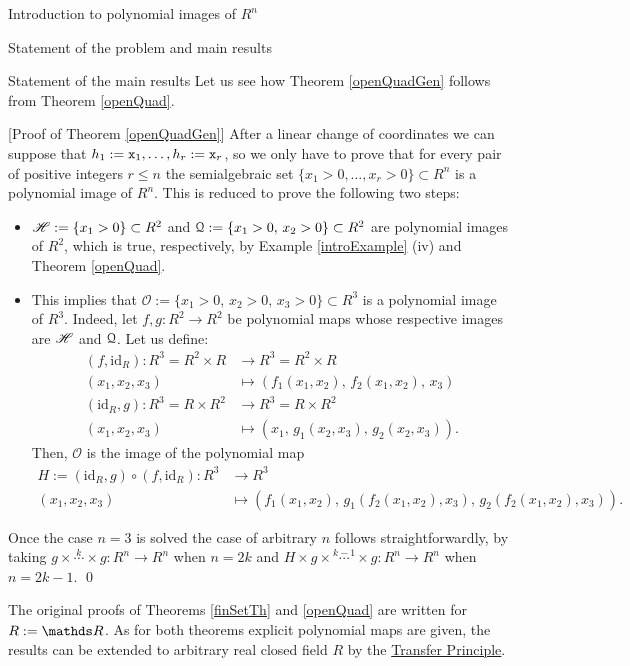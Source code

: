 \documentclass[11pt, a4paper, english, twoside, notitlepage, openright]{report}
\begin{document}
\begin{chapter}{Introduction to polynomial images of $R^n$}
\begin{section}{Statement of the problem and main results}
\begin{subsection}{Statement of the main results}
Let us see how Theorem \ref{openQuadGen} follows from Theorem \ref{openQuad}.
		
\vspace{1mm}		
		
[Proof of Theorem \ref{openQuadGen}] After a linear change of coordinates we can suppose that $h_1:={\tt x}_1,\dots,h_r:={\tt x}_r$, so we only have to prove that for every pair of positive integers $r\leq n$ the semialgebraic set $\{x_1>0,\dots,x_r>0\}\subset R^n$ is a polynomial image of $R^n$. This is reduced to prove the following two steps:
\begin{itemize}
\item $\mathscr{H}:=\{x_1>0\}\subset R^2$ and $\mathcal{Q}:=\{x_1>0,\,x_2>0\}\subset R^2$ are polynomial images of $R^2$, which is true, respectively, by Example \ref{introExample} (iv) and Theorem \ref{openQuad}.
\item This implies that $\mathscr{O}:=\{x_1>0,\, x_2>0,\, x_3>0\}\subset R^3$ is a polynomial image of $R^3$. Indeed, let $f,g:R^2 \rightarrow R^2$ be polynomial maps whose respective images are $\mathscr{H}$ and $\mathcal{Q}$. Let us define:
\begin{align*}
(f,\text{id}_R): R^3=R^2\times R&\longrightarrow R^3= R^2\times R\\
(x_1,x_2,x_3) &\longmapsto (f_1(x_1, x_2),\, f_2(x_1, x_2),\, x_3)\\
(\text{id}_R,g): R^3=R\times R^2&\longrightarrow R^3= R\times R^2\\
(x_1,x_2,x_3) &\longmapsto (x_1,\, g_1(x_2, x_3),\, g_2(x_2, x_3)).
\end{align*}
Then, $\mathscr{O}$ is the image of the polynomial map 
\begin{align*}
H:=(\text{id}_R,g)\circ(f,\text{id}_R):R^3&\longrightarrow R^3\\
(x_1,x_2,x_3) &\longmapsto (f_1(x_1, x_2),\, g_1(f_2(x_1, x_2), x_3),\, g_2(f_2(x_1, x_2), x_3)).
\end{align*}
\end{itemize} 
Once the case $n=3$ is solved the case of arbitrary $n$ follows straightforwardly, by taking $g \times \overset{k}{\cdots} \times g: R^n \longrightarrow R^n$ when $n=2k$ and $H \times g \times \overset{k-1}{\cdots} \times g: R^n \longrightarrow R^n$ when $n=2k-1$. \qed

\vspace{1mm}
		
The original proofs of Theorems \ref{finSetTh} and \ref{openQuad} are written for $R:=\R$. As for both theorems explicit polynomial maps are given, the results can be extended to arbitrary real closed field $R$ by the \hyperref[TP]{Transfer Principle}.
\end{subsection}
\end{section}


\end{chapter}
\end{document}
